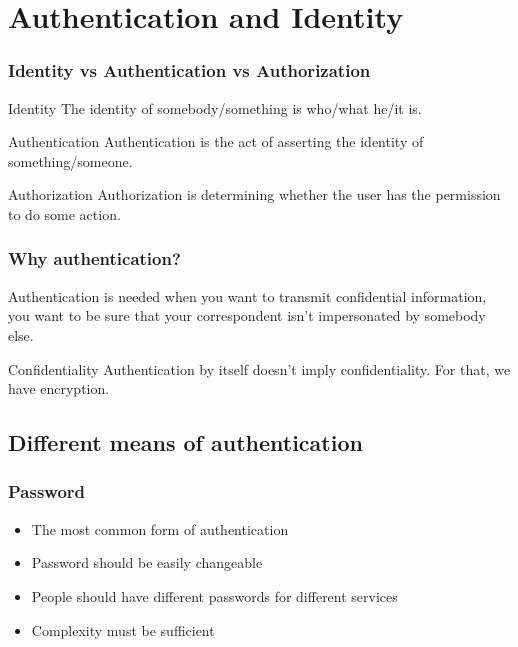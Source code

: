 \section{Authentication and Identity}

\begin{frame}
\frametitle{Identity vs Authentication vs Authorization}
\begin{block}{Identity}
The identity of somebody/something is who/what he/it is.
\end{block}
\begin{block}{Authentication}
Authentication is the act of asserting the identity of something/someone.
\end{block}
\begin{block}{Authorization}
Authorization is determining whether the user has the permission to do some
action.
\end{block}
\end{frame}

\begin{frame}
\frametitle{Why authentication?}
Authentication is needed when you want to transmit confidential
information, you want to be sure that your correspondent isn't
impersonated by somebody else.
\begin{block}{Confidentiality}
Authentication by itself doesn't imply confidentiality.
For that, we have encryption.
\end{block}
\end{frame}

\subsection{Different means of authentication}

\begin{frame}
\frametitle{Password}

\begin{itemize}
\item The most common form of authentication
\item Password should be easily changeable
\item People should have different passwords for different services
\item Complexity must be sufficient
\end{itemize}
\end{frame}

